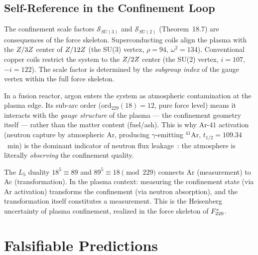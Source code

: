 \subsection{Self-Reference in the Confinement Loop}

The confinement scale factors $\mathcal{S}_{SU(3)}$ and $\mathcal{S}_{SU(2)}$ (Theorem~18.7) are consequences of the force skeleton. Superconducting coils align the plasma with the $Z/3Z$ center of $Z/12Z$ (the SU(3) vertex, $\rho = 94$, $\omega^2 = 134$). Conventional copper coils restrict the system to the $Z/2Z$ center (the SU(2) vertex, $i = 107$, $-i = 122$). The scale factor is determined by the \emph{subgroup index} of the gauge vertex within the full force skeleton.

\begin{remark}\label{rem:ar-ac-fusion}
In a fusion reactor, argon enters the system as atmospheric contamination at the plasma edge. Its sub-arc order ($\mathrm{ord}_{229}(18) = 12$, pure force level) means it interacts with the \emph{gauge structure} of the plasma --- the confinement geometry itself --- rather than the matter content (fuel/ash). This is why Ar-$41$ activation (neutron capture by atmospheric Ar, producing $\gamma$-emitting $^{41}$Ar, $t_{1/2} = 109.34$~min) is the dominant indicator of neutron flux leakage~\cite{Fukui2004Ar41}: the atmosphere is literally \emph{observing} the confinement quality.

The $L_5$ duality $18^5 \equiv 89$ and $89^5 \equiv 18 \pmod{229}$ connects Ar (measurement) to Ac (transformation). In the plasma context: measuring the confinement state (via Ar activation) transforms the confinement (via neutron absorption), and the transformation itself constitutes a measurement. This is the Heisenberg uncertainty of plasma confinement, realized in the force skeleton of $F_{229}^*$.
\end{remark}

\section{Falsifiable Predictions}

